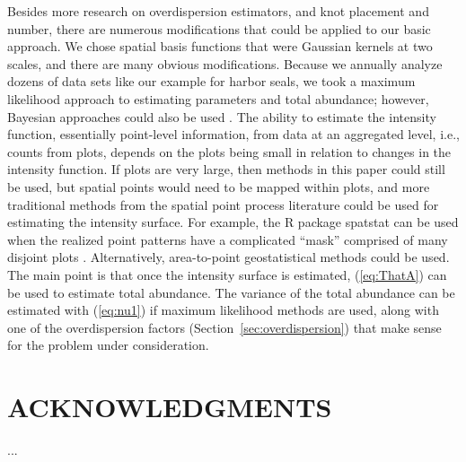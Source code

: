 \documentclass[12pt, titlepage]{article}\usepackage[]{graphicx}\usepackage[]{color}
\begin{document}
Besides more research on overdispersion estimators, and knot placement and number, there are numerous modifications that could be applied to our basic approach. We chose spatial basis functions that were Gaussian kernels at two scales, and there are many obvious modifications.  Because we annually analyze dozens of data sets like our example for harbor seals, we took a maximum likelihood approach to estimating parameters and total abundance; however, Bayesian approaches could also be used \citep{Wikl:spat:2002, Chri:Waag:baye:2002}.  The ability to estimate the intensity function, essentially point-level information, from data at an aggregated level, i.e., counts from plots, depends on the plots being small in relation to changes in the intensity function. If plots are very large, then methods in this paper could still be used, but spatial points would need to be mapped within plots, and more traditional methods from the spatial point process literature could be used for estimating the intensity surface. For example, the R \citep{R:Deve:Core:ALan:2014} package spatstat \citep{Badd:Turn:spat:2005} can be used when the realized point patterns have a complicated ``mask'' comprised of many disjoint plots \citep{Badd:Turn:mode:2006}. Alternatively, area-to-point geostatistical methods \citep{Kyri:geos:2004} could be used. The main point is that once the intensity surface is estimated, (\ref{eq:ThatA}) can be used to estimate total abundance.  The variance of the total abundance can be estimated with (\ref{eq:nu1}) if maximum likelihood methods are used, along with one of the overdispersion factors (Section~\ref{sec:overdispersion}) that make sense for the problem under consideration.

 
\section*{ACKNOWLEDGMENTS} 

...

\end{document}
